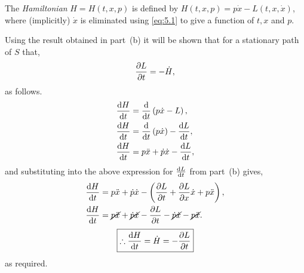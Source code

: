 The \textit{Hamiltonian} $H=H(t,x,p)$ is defined by $H(t,x,p) = p\dot{x} - L(t,x,\dot{x})$, where (implicitly) $\dot{x}$ is eliminated using \eqref{eq:5.1} to give a function of $t,x$ and $p$.

Using the result obtained in part~(b) it will be shown that for a stationary path of $S$ that,
\begin{equation}
	\frac{\partial L}{\partial t} = -\dot{H},
\end{equation}
as follows.
\begin{align*}
	\frac{\mathrm{d}H}{\mathrm{d}t} &= \frac{\mathrm{d}}{\mathrm{d}t}\left(p\dot{x} - L\right),\\
	\frac{\mathrm{d}H}{\mathrm{d}t}&= \frac{\mathrm{d}}{\mathrm{d}t}\left(p\dot{x}\right) -\frac{\mathrm{d}L}{\mathrm{d}t},\\
	\frac{\mathrm{d}H}{\mathrm{d}t}&= p\ddot{x} + \dot{p}\dot{x} -\frac{\mathrm{d}L}{\mathrm{d}t},
\end{align*}
and substituting into the above expression for  $\frac{\mathrm{d}L}{\mathrm{d}t}$  from part~(b) gives,
\begin{align*}
	\frac{\mathrm{d}H}{\mathrm{d}t} &= p\ddot{x} + \dot{p}\dot{x} - \left(\frac{\partial L}{\partial t} + \frac{\partial L}{\partial x}\dot{x} + p\ddot{x}\right),\\
	\frac{\mathrm{d}H}{\mathrm{d}t}&= \cancel{p\ddot{x}} + \cancel{\dot{p}\dot{x}} - \frac{\partial L}{\partial t} - \cancel{\dot{p}\dot{x}} - \cancel{p\ddot{x}}.
\end{align*}
\[
	\boxed{\therefore \frac{\mathrm{d}H}{\mathrm{d}t} = \dot{H} = -\frac{\partial L}{\partial t}}
\]
as required.
